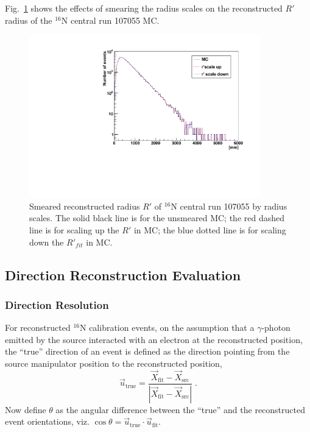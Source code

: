 Fig.~\ref{fig:RscaleSmear} shows the effects of smearing the radius scales on the reconstructed $R'$ radius of the $^{16}$N central run 107055 MC. 

\begin{figure}
	\centering
	\includegraphics[width=10cm]{smearRadResol.pdf}
	\caption[Smeared reconstructed radius $R'$ spectrum of $^{16}$N central run 107055 MC by radius scales.]{Smeared reconstructed radius $R'$ of $^{16}$N central run 107055 by radius scales. The solid black line is for the unsmeared MC; the red dashed line is for scaling up the $R'$ in MC; the blue dotted line is for scaling down the $R'_{fit}$ in MC.\label{fig:RscaleSmear}}
\end{figure} 


\subsection{Direction Reconstruction Evaluation}

\subsubsection{Direction Resolution}

For reconstructed $^{16}$N calibration events, on the assumption that a $\gamma$-photon emitted by the source interacted with an electron at the reconstructed position, the ``true'' direction of an event is defined as the direction pointing from the source manipulator position to the reconstructed position,
\begin{equation}
\vec{u}_{\mathrm{true}} = \frac{\vec{X}_{\mathrm{fit}}-\vec{X}_{\mathrm{src}}}{|\vec{X}_{\mathrm{fit}}-\vec{X}_\mathrm{src}|} \; .
\end{equation}
Now define $\theta$ as the angular difference between the ``true'' and the reconstructed event orientations, viz. $\cos\theta= \vec{u}_{\mathrm{true}} \cdot \vec{u}_{\mathrm{fit}}$.

